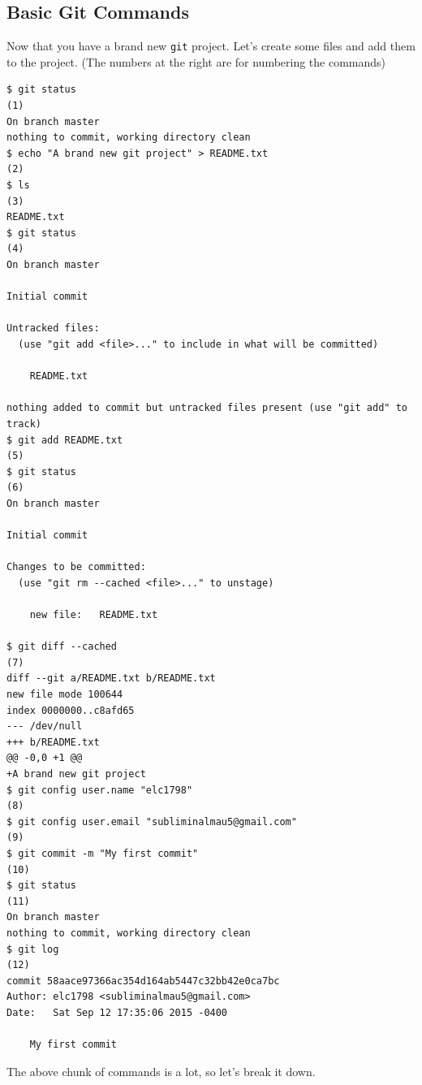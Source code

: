 \documentclass[11pt,fleqn]{article}
\theoremstyle{definition}
\begin{document}
\subsection{Basic Git Commands}
Now that you have a brand new \texttt{git} project. Let's create some files and
add them to the project. (The numbers at the right are for numbering the
commands)
\begin{verbatim}
$ git status                                                          (1)
On branch master
nothing to commit, working directory clean
$ echo "A brand new git project" > README.txt                         (2)
$ ls                                                                  (3)
README.txt
$ git status                                                          (4)
On branch master

Initial commit

Untracked files:
  (use "git add <file>..." to include in what will be committed)

	README.txt

nothing added to commit but untracked files present (use "git add" to track)
$ git add README.txt                                                  (5)
$ git status                                                          (6)
On branch master

Initial commit

Changes to be committed:
  (use "git rm --cached <file>..." to unstage)

	new file:   README.txt

$ git diff --cached                                                   (7)
diff --git a/README.txt b/README.txt
new file mode 100644
index 0000000..c8afd65
--- /dev/null
+++ b/README.txt
@@ -0,0 +1 @@
+A brand new git project
$ git config user.name "elc1798"                                      (8)
$ git config user.email "subliminalmau5@gmail.com"                    (9)
$ git commit -m "My first commit"                                     (10)
$ git status                                                          (11)
On branch master
nothing to commit, working directory clean
$ git log                                                             (12)
commit 58aace97366ac354d164ab5447c32bb42e0ca7bc
Author: elc1798 <subliminalmau5@gmail.com>
Date:   Sat Sep 12 17:35:06 2015 -0400

    My first commit
\end{verbatim}
The above chunk of commands is a lot, so let's break it down.
\end{document}
